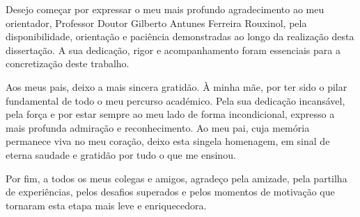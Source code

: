 Desejo começar por expressar o meu mais profundo agradecimento ao meu orientador, Professor Doutor Gilberto Antunes Ferreira Rouxinol, pela disponibilidade, orientação e paciência demonstradas ao longo da realização desta dissertação. A sua dedicação, rigor e acompanhamento foram essenciais para a concretização deste trabalho.

Aos meus pais, deixo a mais sincera gratidão. À minha mãe, por ter sido o pilar fundamental de todo o meu percurso académico. Pela sua dedicação incansável, pela força e por estar sempre ao meu lado de forma incondicional, expresso a mais profunda admiração e reconhecimento. Ao meu pai, cuja memória permanece viva no meu coração, deixo esta singela homenagem, em sinal de eterna saudade e gratidão por tudo o que me ensinou.

Por fim, a todos os meus colegas e amigos, agradeço pela amizade, pela partilha de experiências, pelos desafios superados e pelos momentos de motivação que tornaram esta etapa mais leve e enriquecedora.